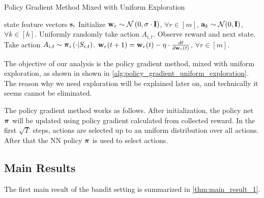 \begin{algorithm}[h]
   \caption{Policy Gradient Method Mixed with Uniform Exploration}
\label{alg:policy_gradient_uniform_exploration}
\begin{algorithmic}
    state feature vectors ${\mathbf{s}}_i$
   \STATE Initialize ${\mathbf{w}}_r \sim {\mathcal{N}}\left( 0, \sigma \cdot {\mathbf{I}} \right)$, $\forall r \in [m]$, ${\mathbf{a}}_k \sim {\mathcal{N}}(0, {\mathbf{I}})$, $\forall k \in [h]$.
   \STATE Uniformly randomly take action $A_{i,t}$. 
   \STATE Observe reward and next state.
   \ELSE
   \STATE Take action $A_{i,t} \sim {\boldsymbol{\pi}}_{i}\left(\cdot \middle| S_{i,t} \right)$. 
   \ENDIF
   \STATE ${\mathbf{w}}_r(t+1) = {\mathbf{w}}_r(t) - \eta \cdot \frac{d\ell}{d {\mathbf{w}}_r(t)}$, $\forall r \in [m]$.
   \ENDFOR
\end{algorithmic}
\end{algorithm}

The objective of our analysis is the policy gradient method, mixed with uniform exploration, as shown in shown in \cref{alg:policy_gradient_uniform_exploration}. The reason why we need exploration will be explained later on, and technically it seems cannot be eliminated.

The policy gradient method works as follows. After initialization, the policy net ${\boldsymbol{\pi}}$ will be updated using policy gradient calculated from collected reward. In the first $\sqrt{T}$ steps, actions are selected up to an uniform distribution over all actions. After that the NN policy ${\boldsymbol{\pi}}$ is used to select actions.

\subsection{Main Results}

The first main result of the bandit setting is summarized in \cref{thm:main_result_1}.

